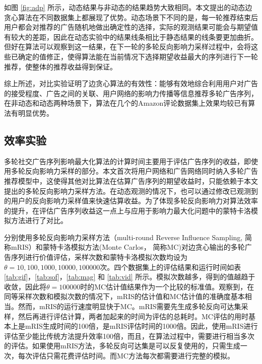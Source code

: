 如图 \ref{fig:adp} 所示，动态结果与非动态的结果趋势大致相同。本文提出的动态边贪心算法在不同数据集上都展现了优势。动态场景下不同的是，每一轮推荐结束后用户都会对推荐的广告随机地做出确定性的选择，实际的观测结果可能会与期望值有较大的差距，因此在动态实验中的结果线条相比于静态结果的线条要更加曲折。但好在算法可以观察到这一结果，在下一轮的多轮反向影响力采样过程中，会将这些已确定的值修正，使得算法能在当前情况下选择期望收益最大的序列进行下一轮推荐，使整体的推荐收益得到保证。

综上所述，对比实验证明了边贪心算法的有效性：能够有效地综合利用用户对广告的接受程度、广告之间的关联、用户网络的影响力传播等信息推荐多轮广告序列，在非动态和动态两种场景下，算法在几个的Amazon评论数据集上效果均较已有算法有明显优势。

\subsection{效率实验}

多轮社交广告序列影响最大化算法的计算时间主要用于评估广告序列的收益，即使用多轮反向影响力采样的部分。本文首次将用户网络和广告网络同时纳入多轮广告推荐模型中，这使得其他对比算法在估算广告序列的期望收益时，只能依赖于本文提出的多轮反向影响力采样方法。在动态观测的情况下，也可以通过修改已观测到的用户的反向影响力采样值来快速估算收益。为了体现多轮反向影响力对算法效率的提升，在评估广告序列收益这一点上与应用于影响力最大化问题中的蒙特卡洛模拟方法\cite{kempe2003maximizing}进行了对比。

分别使用多轮反向影响力采样方法（multi-round Reverse Influence Sampling, 简称mRIS）和蒙特卡洛模拟方法(Monte Carlos， 简称MC)对边贪心输出的多轮广告序列进行价值评估，采样次数和蒙特卡洛模拟次数均设为$\theta={10,100,1000,10000,100000}$次。四个数据集上的评估结果和运行时间如表 \ref{tab:gif}，\ref{tab:sof}，\ref{tab:mag} 和 \ref{tab:vid} 所示。模拟次数越多，得到的值越趋于收敛，因此将$\theta=100000$时的MC估计值结果作为一个比较的标准值。观察到，在同等采样次数和模拟次数的情况下，mRIS的估计值和MC估计值的准确度基本相当。然而，mRIS的运行速度明显快于MC。mRIS需要先生成多轮反向可达集采样，然后再进行评估计算，两者加起来的时间为评估的总耗时。MC评估的用时基本上是mRIS生成时间的100倍，是mRIS评估时间的1000倍。因此，使用mRIS进行评估至少能比传统方法提升效率100倍，而且，在算法过程中，需要进行相当多次的评估。如果使用mRIS方法，多轮反向可达集是可以反复使用的，只需生成一次，每次评估只需花费评估时间。而MC方法每次都需要进行完整的模拟。

